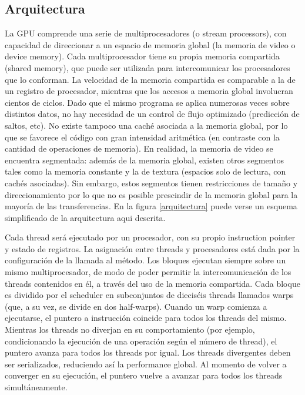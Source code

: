 \documentclass[a4paper,10pt]{report}
\begin{document}
\subsection{Arquitectura}

La GPU comprende una serie de multiprocesadores (o stream processors), con capacidad de direccionar a un espacio de memoria global (la memoria de video o device memory). 
Cada multiprocesador tiene su propia memoria compartida (shared memory), que puede ser utilizada para intercomunicar los procesadores que lo conforman.
La velocidad de la memoria compartida es comparable a la de un registro de procesador, mientras que los accesos a memoria global involucran cientos de ciclos. 
Dado que el mismo programa se aplica numerosas veces sobre distintos datos, no hay necesidad de un control de flujo optimizado (predicción de saltos, etc). 
No existe tampoco una caché asociada a la memoria global, por lo que se favorece el código con gran intensidad aritmética (en contraste con la cantidad de operaciones de memoria).
En realidad, la memoria de video se encuentra segmentada: además de la memoria global, existen otros segmentos tales como la memoria constante y la de textura (espacios solo de lectura, con cachés
asociadas). Sin embargo, estos segmentos tienen restricciones de tamaño y direccionamiento por lo que no es posible prescindir de la memoria global para la mayoría de las transferencias. 
En la figura \ref{arquitectura} puede verse un esquema simplificado de la arquitectura aqui descrita.

Cada thread será ejecutado por un procesador, con su propio instruction pointer y estado de registros.
La asignación entre threads y procesadores está dada por la configuración de la llamada al método. Los bloques ejecutan siempre sobre un mismo multiprocesador, de modo de poder permitir la intercomunicación de los threads contenidos en él, a través del uso de la memoria compartida. Cada bloque es
dividido por el scheduler en subconjuntos de dieciséis threads llamados warps (que, a su vez, se divide en dos half-warps). 
Cuando un warp comienza a ejecutarse, el puntero a instrucción coincide para todos los threads del mismo. Mientras los threads no diverjan en su comportamiento (por ejemplo, condicionando la ejecución de una operación según el número de thread), el puntero avanza para todos los threads por igual. 
Los threads divergentes deben ser serializados, reduciendo así la performance global. Al momento de volver a converger en su ejecución, el puntero vuelve a avanzar para todos los threads simultáneamente.
\end{document}
